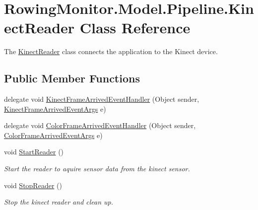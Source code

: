 \hypertarget{class_rowing_monitor_1_1_model_1_1_pipeline_1_1_kinect_reader}{}\section{Rowing\+Monitor.\+Model.\+Pipeline.\+Kinect\+Reader Class Reference}
\label{class_rowing_monitor_1_1_model_1_1_pipeline_1_1_kinect_reader}


The \hyperlink{class_rowing_monitor_1_1_model_1_1_pipeline_1_1_kinect_reader}{Kinect\+Reader} class connects the application to the Kinect device.  


\subsection*{Public Member Functions}
\begin{DoxyCompactItemize}
\item 
delegate void \hyperlink{class_rowing_monitor_1_1_model_1_1_pipeline_1_1_kinect_reader_a324ac8a3e20e308a754f163e0925e95a}{Kinect\+Frame\+Arrived\+Event\+Handler} (Object sender, \hyperlink{class_rowing_monitor_1_1_model_1_1_kinect_frame_arrived_event_args}{Kinect\+Frame\+Arrived\+Event\+Args} e)
\item 
delegate void \hyperlink{class_rowing_monitor_1_1_model_1_1_pipeline_1_1_kinect_reader_aefbafde39c2c91e3b57c1db7073198bc}{Color\+Frame\+Arrived\+Event\+Handler} (Object sender, \hyperlink{class_rowing_monitor_1_1_model_1_1_color_frame_arrived_event_args}{Color\+Frame\+Arrived\+Event\+Args} e)
\item 
void \hyperlink{class_rowing_monitor_1_1_model_1_1_pipeline_1_1_kinect_reader_a191df86e5b421857d4eed6a534738461}{Start\+Reader} ()
\begin{DoxyCompactList}\small\item\em Start the reader to aquire sensor data from the kinect sensor. \end{DoxyCompactList}\item 
void \hyperlink{class_rowing_monitor_1_1_model_1_1_pipeline_1_1_kinect_reader_a1beeef16207c67ed6a29d0c7b47b368d}{Stop\+Reader} ()
\begin{DoxyCompactList}\small\item\em Stop the kinect reader and clean up. \end{DoxyCompactList}\end{DoxyCompactItemize}
